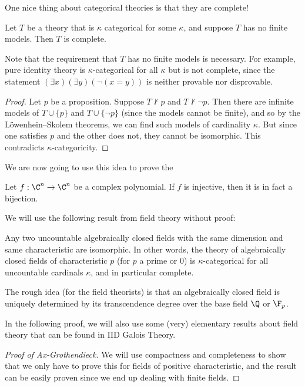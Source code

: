 \documentclass[a4paper]{article}
\begin{document}
\begin{own}
  One nice thing about categorical theories is that they are complete!
  \begin{prop}
    Let $T$ be a theory that is $\kappa$ categorical for some $\kappa$, and suppose $T$ has no finite models. Then $T$ is complete.
  \end{prop}
  Note that the requirement that $T$ has no finite models is necessary. For example, pure identity theory is $\kappa$-categorical for all $\kappa$ but is not complete, since the statement $(\exists x)(\exists y)(\neg (x = y))$ is neither provable nor disprovable.
  \begin{proof}
    Let $p$ be a proposition. Suppose $T \not\vdash p$ and $T \not\vdash \neg p$. Then there are infinite models of $T \cup \{p\}$ and $T \cup \{\neg p\}$ (since the models cannot be finite), and so by the L\"owenhein--Skolem theorems, we can find such models of cardinality $\kappa$. But since one satisfies $p$ and the other does not, they cannot be isomorphic. This contradicts $\kappa$-categoricity.
  \end{proof}

  We are now going to use this idea to prove the 
  \begin{thm}
    Let $f: \C^n \to \C^n$ be a complex polynomial. If $f$ is injective, then it is in fact a bijection.
  \end{thm}

  We will use the following result from field theory without proof:
  \begin{lemma}
    Any two uncountable algebraically closed fields with the same dimension and same characteristic are isomorphic. In other words, the theory of algebraically closed fields of characteristic $p$ (for $p$ a prime or $0$) is $\kappa$-categorical for all uncountable cardinals $\kappa$, and in particular complete.
  \end{lemma}
  The rough idea (for the field theorists) is that an algebraically closed field is uniquely determined by its transcendence degree over the base field $\Q$ or $\F_p$.

  In the following proof, we will also use some (very) elementary results about field theory that can be found in IID Galois Theory.

  \begin{proof}[Proof of Ax-Grothendieck]
    We will use compactness and completeness to show that we only have to prove this for fields of positive characteristic, and the result can be easily proven since we end up dealing with finite fields.


\end{proof}
\end{own}
\end{document}
